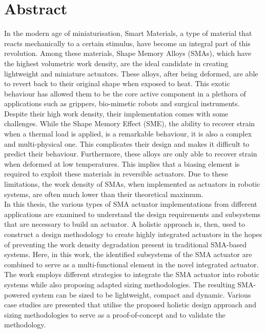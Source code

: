 

\cleardoublepage
\chapter*{Abstract}

In the modern age of miniaturisation, Smart Materials, a type of material that reacts mechanically to a certain stimulus, have become an integral part of this revolution. Among these materials, Shape Memory Alloys (SMAs), which have the highest volumetric work density, are the ideal candidate in creating lightweight and miniature actuators. These alloys, after being deformed, are able to revert back to their original shape when exposed to heat. This exotic behaviour has allowed them to be the core active component in a plethora of applications such as grippers, bio-mimetic robots and surgical instruments.\\

Despite their high work density, their implementation comes with some challenges. While the Shape Memory Effect (SME), the ability to recover strain when a thermal load is applied, is a remarkable behaviour, it is also a complex and multi-physical one. This complicates their design and makes it difficult to predict their behaviour. Furthermore, these alloys are only able to recover strain when deformed at low temperatures. This implies that a biasing element is required to exploit these materials in reversible actuators. Due to these limitations, the work density of SMAs, when implemented as actuators in robotic systems, are often much lower than their theoretical maximum.\\

In this thesis, the various types of SMA actuator implementations from different applications are examined to understand the design requirements and subsystems that are necessary to build an actuator. A holistic approach is, then, used to construct a design methodology to create highly integrated actuators in the hopes of preventing the work density degradation present in traditional SMA-based systems. Here, in this work, the identified subsystems of the SMA actuator are combined to serve as a multi-functional element in the novel integrated actuator.\\

The work employs different strategies to integrate the SMA actuator into robotic systems while also proposing adapted sizing methodologies. The resulting SMA-powered system can be sized to be lightweight, compact and dynamic. Various case studies are presented that utilise the proposed holistic design approach and sizing methodologies to serve as a proof-of-concept and to validate the methodology.\\

